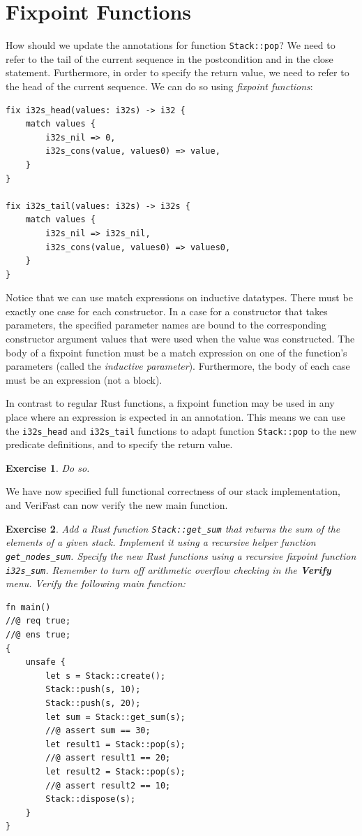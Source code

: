 \documentclass{article}
\newtheorem{exercise}{Exercise}
\begin{document}
\section{Fixpoint Functions}

How should we update the annotations for function
\lstinline!Stack::pop!? We need to refer to the tail of the
current sequence in the postcondition and in the close
statement. Furthermore, in order to specify the return value,
we need to refer to the head of the current sequence. We can do
so using \emph{fixpoint functions}:
\begin{lstlisting}
fix i32s_head(values: i32s) -> i32 {
    match values {
        i32s_nil => 0,
        i32s_cons(value, values0) => value,
    }
}

fix i32s_tail(values: i32s) -> i32s {
    match values {
        i32s_nil => i32s_nil,
        i32s_cons(value, values0) => values0,
    }
}
\end{lstlisting}
Notice that we can use match expressions on inductive
datatypes. There must be exactly one case for each constructor.
In a case for a constructor that takes parameters, the
specified parameter names are bound to the corresponding
constructor argument values that were used when the value was
constructed. The body of a fixpoint function must be a match
expression on one of the function's parameters (called the
\emph{inductive parameter}). Furthermore, the body of each case
must be an expression (not a block).

In contrast to regular Rust functions, a fixpoint function may be
used in any place where an expression is expected in an
annotation. This means we can use the \lstinline!i32s_head! and
\lstinline!i32s_tail! functions to adapt function
\lstinline!Stack::pop! to the new predicate definitions, and to
specify the return value.

\begin{exercise}\label{exercise:fixpoints}
Do so.
\end{exercise}

We have now specified full functional correctness of our stack
implementation, and VeriFast can now verify the new main
function.

\begin{exercise}\label{exercise:sum_full}
Add a Rust function \lstinline!Stack::get_sum! that returns the sum
of the elements of a given stack. Implement it using a
recursive helper function \lstinline!get_nodes_sum!. Specify
the new Rust functions using a recursive fixpoint function
\lstinline!i32s_sum!. Remember to turn off arithmetic
overflow checking in the \textbf{Verify} menu. Verify the
following main function:
\end{exercise}
\begin{lstlisting}
fn main()
//@ req true;
//@ ens true;
{
    unsafe {
        let s = Stack::create();
        Stack::push(s, 10);
        Stack::push(s, 20);
        let sum = Stack::get_sum(s);
        //@ assert sum == 30;
        let result1 = Stack::pop(s);
        //@ assert result1 == 20;
        let result2 = Stack::pop(s);
        //@ assert result2 == 10;
        Stack::dispose(s);
    }
}
\end{lstlisting}
\end{document}
